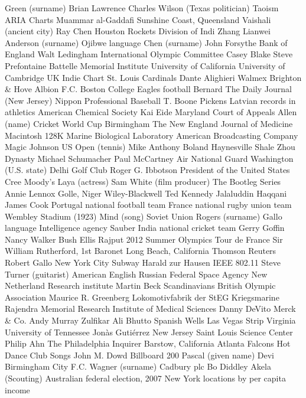 Green (surname)  Brian Lawrence  Charles Wilson (Texas politician)  
Taoism  ARIA Charts  Muammar al-Gaddafi  
Sunshine Coast, Queensland  Vaishali (ancient city)  Ray Chen  
Houston Rockets  Division of Indi  Zhang Lianwei  
Anderson (surname)  Ojibwe language  Chen (surname)  
John Forsythe  Bank of England  Walt Ledingham  
International Olympic Committee  Casey Blake  Steve Prefontaine  
Battelle Memorial Institute  University of California  University of Cambridge  
UK Indie Chart  St. Louis Cardinals  Dante Alighieri  
Walmex  Brighton & Hove Albion F.C.  Boston College Eagles football  
Bernard  The Daily Journal (New Jersey)  Nippon Professional Baseball  
T. Boone Pickens  Latvian records in athletics  American Chemical Society  
Kai Eide  Maryland Court of Appeals  Allen (name)  
Cricket World Cup  Birmingham  The New England Journal of Medicine  
Macintosh 128K  Marine Biological Laboratory  American Broadcasting Company  
Magic Johnson  US Open (tennis)  Mike Anthony Boland  
Haynesville Shale  Zhou Dynasty  Michael Schumacher  
Paul McCartney  Air National Guard  Washington (U.S. state)  
Delhi Golf Club  Roger G. Ibbotson  President of the United States  
Cree  Moody's  Laya (actress)  
Sam White (film producer)  The Bootleg Series  Annie Lennox  
Golle, Niger  Wiley-Blackwell  Ted Kennedy  
Jalaluddin Haqqani  James Cook  Portugal national football team  
France national rugby union team  Wembley Stadium (1923)  Mind (song)  
Soviet Union  Rogers (surname)  Gallo language  
Intelligence agency  Sauber  India national cricket team  
Gerry Goffin  Nancy Walker Bush Ellis  Rajput  
2012 Summer Olympics  Tour de France  Sir William Rutherford, 1st Baronet  
Long Beach, California  Thomson Reuters  Robert Gallo  
New York City Subway  Harald zur Hausen  IEEE 802.11  
Steve Turner (guitarist)  American English  Russian Federal Space Agency  
New Netherland  Research institute  Martin Beck  
Scandinavians  British Olympic Association  Maurice R. Greenberg  
Lokomotivfabrik der StEG  Kriegsmarine  Rajendra Memorial Research Institute of Medical Sciences  
Danny DeVito  Merck &  Co.  Andy Murray  
Zulfikar Ali Bhutto  Spanish Wells  Las Vegas Strip  
Virginia  University of Tennessee  Jonàs Gutiérrez  
New Jersey  Saint Louis Science Center  Philip Ahn  
The Philadelphia Inquirer  Barstow, California  Atlanta Falcons  
Hot Dance Club Songs  John M. Dowd  Billboard 200  
Pascal (given name)  Devi  Birmingham City F.C.  
Wagner (surname)  Cadbury plc  Bo Diddley  
Akela (Scouting)  Australian federal election, 2007  New York locations by per capita income  
